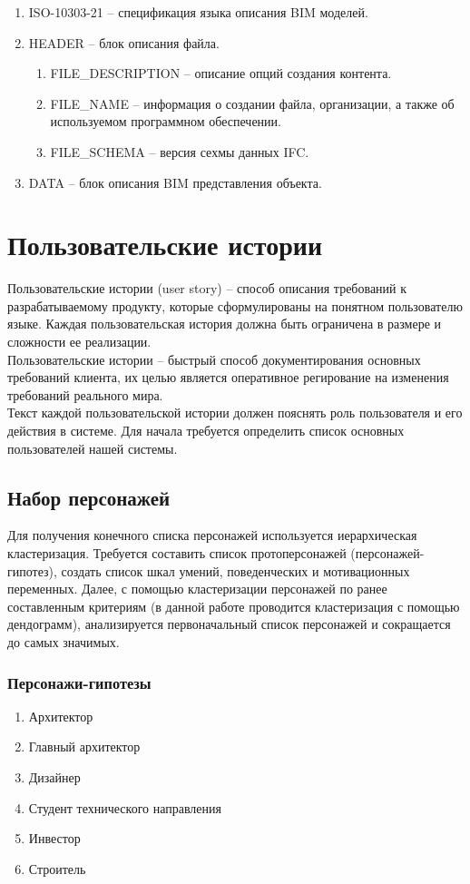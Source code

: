 \documentclass[a4paper,14pt]{extreport} %
\begin{document}
\newpage
\begin{enumerate}
\item ISO-10303-21 -- спецификация языка описания BIM моделей.
\item HEADER -- блок описания файла.
\begin{enumerate}
\item FILE\_DESCRIPTION -- описание опций создания контента.
\item FILE\_NAME -- информация о создании файла, организации, а также об используемом программном обеспечении.
\item FILE\_SCHEMA -- версия сехмы данных IFC.
\end{enumerate}
\item DATA -- блок описания BIM представления объекта.
\end{enumerate}

\newpage
\section{Пользовательские истории}

Пользовательские истории (user story) -- способ описания требований к разрабатываемому продукту, которые сформулированы на понятном пользователю языке. Каждая пользовательская история должна быть ограничена в размере и сложности ее реализации. \\
Пользовательские истории -- быстрый способ документирования основных требований клиента, их целью является оперативное регирование на изменения требований реального мира. \\
Текст каждой пользовательской истории должен пояснять роль пользователя и его действия в системе. Для начала требуется определить список основных пользователей нашей системы.

\subsection{Набор персонажей}

Для получения конечного списка персонажей используется иерархическая кластеризация. Требуется составить список протоперсонажей (персонажей-гипотез), создать список шкал умений, поведенческих и мотивационных переменных. Далее, с помощью кластеризации персонажей по ранее составленным критериям (в данной работе проводится кластеризация с помощью дендограмм), анализируется первоначальный список персонажей и сокращается до самых значимых.

\subsubsection{Персонажи-гипотезы}
\begin{enumerate}
\item Архитектор
\item Главный архитектор
\item Дизайнер
\item Студент технического направления
\item Инвестор
\item Строитель
\end {enumerate}
\end{document}

